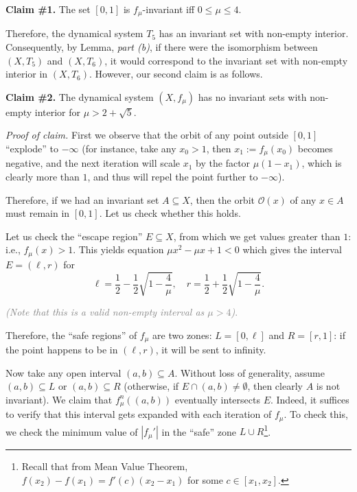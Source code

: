 \documentclass{template}
\begin{document}
\textbf{Claim \#1.} The set $[0,1]$ is $f_{\mu}$-invariant iff $0 \leq \mu \leq 4$.

Therefore, the dynamical system $T_5$ has an invariant set with non-empty
interior. Consequently, by Lemma, \textit{part (b)}, if there were the
isomorphism between $(X,T_5)$ and $(X,T_6)$, it would correspond to the
invariant set with non-empty interior in $(X,T_6)$. However, our second claim 
is as follows.

\textbf{Claim \#2.} The dynamical system $(X,f_{\mu})$ has no invariant sets with non-empty
interior for $\mu > 2+\sqrt{5}$.

\textit{Proof of claim.} First we observe that the orbit of any point outside
$[0,1]$ ``explode'' to $-\infty$ (for instance, take any $x_0>1$, then $x_1 :=
f_{\mu}(x_0)$ becomes negative, and the next iteration will scale $x_1$ by the
factor $\mu(1-x_1)$, which is clearly more than $1$, and thus will repel the
point further to $-\infty$). 

Therefore, if we had an invariant set $A \subseteq X$, then the orbit
$\mathcal{O}(x)$ of any $x \in A$ must remain in $[0,1]$. Let us check whether
this holds.

Let us check the ``escape region'' $E \subseteq X$, from which we get values
greater than $1$: i.e., $f_{\mu}(x) > 1$. This yields equation $\mu x^2 - \mu x
+ 1 < 0$ which gives the interval $E = (\ell,r)$ for 
\begin{equation*}
    \ell = \frac{1}{2} - \frac{1}{2}\sqrt{1-\frac{4}{\mu}}, \quad r = \frac{1}{2} + \frac{1}{2}\sqrt{1-\frac{4}{\mu}}.
\end{equation*} 

\textcolor{gray}{\textit{(Note that this is a valid non-empty interval as $\mu>4$)}.}

Therefore, the ``safe regions'' of $f_{\mu}$ are two zones: $L=[0,\ell]$ and
$R=[r,1]$: if the point happens to be in $(\ell,r)$, it will be sent to
infinity.

Now take any open interval $(a,b) \subseteq A$. Without loss of generality,
assume $(a,b) \subseteq L$ or $(a,b) \subseteq R$ (otherwise, if $E \cap (a,b)
\neq \emptyset$, then clearly $A$ is not invariant). We claim that $f_{\mu}^n((a,b))$
eventually intersects $E$. Indeed, it suffices to verify that this interval gets
expanded with each iteration of $f_{\mu}$. To check this, we check the minimum value
of $|f_{\mu}'|$ in the ``safe'' zone $L \cup R$\footnote{Recall that from Mean
Value Theorem, $f(x_2)-f(x_1) = f'(c)(x_2-x_1)$ for some $c \in [x_1,x_2]$.}. 
\end{document}
